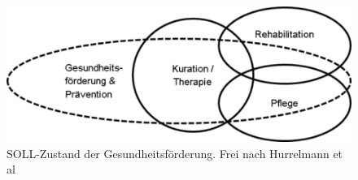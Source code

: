\begin{figure}[h]
	\centering
		\includegraphics{ist-soll.png}
	\caption{SOLL-Zustand der Gesundheitsförderung. Frei nach Hurrelmann et al}
	\label{fig:ist-soll}
\end{figure}